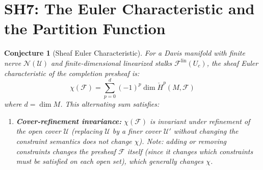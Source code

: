 \documentclass[11pt,letterpaper]{article}
\newtheorem{conjecture}{Conjecture}[section]
\newcommand{\Hcech}{\check{H}}
\newcommand{\sheaf}{\mathcal{F}}
\newcommand{\cover}{\mathcal{U}}
\newcommand{\nerve}{\mathcal{N}}
\begin{document}
\section{SH7: The Euler Characteristic and the Partition Function}

\begin{conjecture}[Sheaf Euler Characteristic]\label{conj:euler}
For a Davis manifold with finite nerve $\nerve(\cover)$ and 
finite-dimensional linearized stalks $\sheaf^{\mathrm{lin}}(U_c)$, 
the \emph{sheaf Euler characteristic} of the completion presheaf is:
\begin{equation}\label{eq:euler_char}
    \chi(\sheaf) = \sum_{p=0}^{d} (-1)^p \dim \Hcech^p(M, \sheaf)
\end{equation}
where $d = \dim M$. This alternating sum satisfies:

\begin{enumerate}[label=(\alph*)]
    \item \textbf{Cover-refinement invariance:} $\chi(\sheaf)$ is 
    invariant under refinement of the open cover $\cover$ (replacing 
    $\cover$ by a finer cover $\cover'$ without changing the constraint 
    semantics does not change $\chi$). Note: \emph{adding or removing 
    constraints} changes the presheaf $\sheaf$ itself (since it changes 
    which constraints must be satisfied on each open set), which 
    generally changes $\chi$.
    

\end{enumerate}
\end{conjecture}
\end{document}
